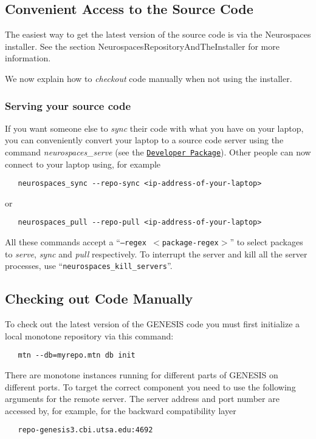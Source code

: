 \documentclass[12pt]{article}
\begin{document}
\subsection*{Convenient Access to the Source Code}

The easiest way to get the latest version of the source code is via the Neurospaces installer. See the section  NeurospacesRepositoryAndTheInstaller for more information.

We now explain how to {\it checkout} code manually when not using the installer.

\subsubsection*{Serving your source code}

If you want someone else to {\it sync} their code with what you have on your laptop, you can conveniently convert your laptop to a source code server using the command {\it neurospaces\_serve} (see the \href{../developer-package/developer-package.tex}{\tt Developer
  Package}). Other people can now connect to your laptop using, for example
\begin{verbatim}
   neurospaces_sync --repo-sync <ip-address-of-your-laptop>
\end{verbatim}
or
\begin {verbatim}
   neurospaces_pull --repo-pull <ip-address-of-your-laptop>
\end{verbatim}
All these commands accept a ``{\tt --regex $<$package-regex$>$}'' to select packages to {\it serve}, {\it sync} and {\it pull} respectively. To interrupt the server and kill all the server processes, use ``{\tt neurospaces\_kill\_servers}''.

\subsection*{Checking out Code Manually}

To check out the latest version of the GENESIS code you must first initialize a local monotone repository via this command:
\begin{verbatim}
   mtn --db=myrepo.mtn db init 
\end{verbatim}
There are monotone instances running for different parts of GENESIS on different ports. To target the correct component you need to use the following arguments for the remote server. The server address and port number are accessed by, for example, for the backward compatibility layer
\begin{verbatim}
   repo-genesis3.cbi.utsa.edu:4692
\end{verbatim}
\end{document}
